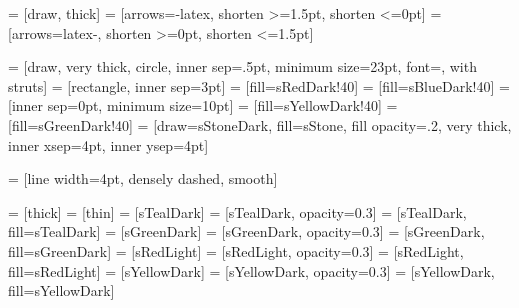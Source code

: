  = [draw, thick]
 = [arrows={-latex}, shorten >=1.5pt, shorten <=0pt]
 = [arrows={latex-}, shorten >=0pt, shorten <=1.5pt]

 = [draw, very thick, circle, inner sep=.5pt, minimum size=23pt, font=\small, with struts]
 = [rectangle, inner sep=3pt]
 = [fill=sRedDark!40]
 = [fill=sBlueDark!40]
 = [inner sep=0pt, minimum size=10pt]
 = [fill=sYellowDark!40]
 = [fill=sGreenDark!40]
 = [draw=sStoneDark, fill=sStone, fill opacity=.2, very thick, inner xsep=4pt, inner ysep=4pt]





 = [line width=4pt, densely dashed, smooth]

 = [thick]
 = [thin]
 = [sTealDark]
 = [sTealDark, opacity=0.3]
 = [sTealDark, fill=sTealDark]
 = [sGreenDark]
 = [sGreenDark, opacity=0.3]
 = [sGreenDark, fill=sGreenDark]
 = [sRedLight]
 = [sRedLight, opacity=0.3]
 = [sRedLight, fill=sRedLight]
 = [sYellowDark]
 = [sYellowDark, opacity=0.3]
 = [sYellowDark, fill=sYellowDark]

